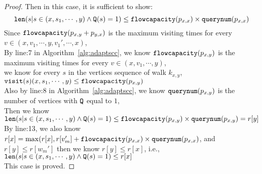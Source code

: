\begin{proof}
  Then in this case, it is sufficient to show: 
  $$ 
  \mathtt{len}(s | s \in (x, s_1, \cdots, y) \land \mathtt{Q}(s) = 1) \leq \mathtt{flowcapacity}(p_{x, x}) \times \mathtt{querynum}(p_{x, x}) 
  $$
Since $\mathtt{flowcapacity}(p_{x, y} + p_{y, x})$ is the maximum visiting times for every $v \in (x, v_1, \cdots, y, v_1', \cdots, x)$, 
\\
By line:7 in Algorithm~\ref{alg:adaptscc}, we know $\mathtt{flowcapacity}(p_{x, y})$ is the maximum visiting times for every $v \in (x, v_1, \cdots, y)$, 
\\
we know for every $s$ in the vertices sequence of walk $k_{x,y}$, 
$\mathtt{visit}(s) (x, s_1, \cdots, y)  \leq \mathtt{flowcapacity}(p_{x, y})$
  \\
  Also by line:8 in Algorithm~\ref{alg:adaptscc}, we know $\mathtt{querynum}(p_{x, y})$ is the number of vertices with $\mathtt{Q}$ equal to $1$,
  \\
  Then we know 
  \\
  $\mathtt{len}(s | s \in (x, s_1, \cdots, y) \land \mathtt{Q}(s) = 1) \leq \mathtt{flowcapacity}(p_{x, y}) \times \mathtt{querynum}(p_{x, y}) = r[y]$
  \\
  By line:13, we also know $r[x] = \max(r[x], r[v_{m}'] + \mathtt{flowcapacity}(p_{x, x}) \times \mathtt{querynum}(p_{x, x})$, and $r[y] \leq r[w_{m}']$
  then we know $r[y] \leq r[x]$, i.e., 
  $\mathtt{len}(s | s \in (x, s_1, \cdots, y) \land \mathtt{Q}(s) = 1) \leq r[x]$
  \\
  This case is proved.
%
%
\end{proof}